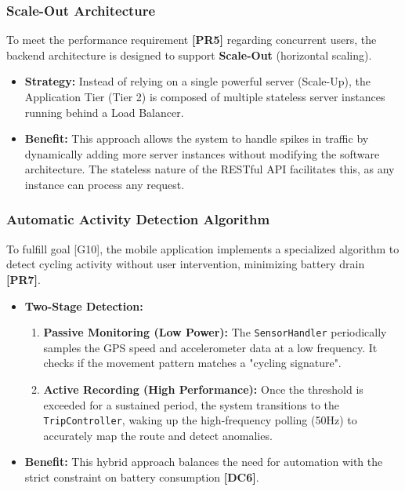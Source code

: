 \subsubsection{Scale-Out Architecture}
To meet the performance requirement \textbf{[PR5]} regarding concurrent users, the backend architecture is designed to support \textbf{Scale-Out} (horizontal scaling).
\begin{itemize}
    \item \textbf{Strategy:} Instead of relying on a single powerful server (Scale-Up), the Application Tier (Tier 2) is composed of multiple stateless server instances running behind a Load Balancer.
    \item \textbf{Benefit:} This approach allows the system to handle spikes in traffic by dynamically adding more server instances without modifying the software architecture. The stateless nature of the RESTful API facilitates this, as any instance can process any request.
\end{itemize}

\subsubsection{Automatic Activity Detection Algorithm}
To fulfill goal [G10], the mobile application implements a specialized algorithm to detect cycling activity without user intervention, minimizing battery drain \textbf{[PR7]}.
\begin{itemize}
    \item \textbf{Two-Stage Detection:}
    \begin{enumerate}
        \item \textbf{Passive Monitoring (Low Power):} The \texttt{SensorHandler} periodically samples the GPS speed and accelerometer data at a low frequency. It checks if the movement pattern matches a "cycling signature".
        \item \textbf{Active Recording (High Performance):} Once the threshold is exceeded for a sustained period, the system transitions to the \texttt{TripController}, waking up the high-frequency polling (50Hz) to accurately map the route and detect anomalies.
    \end{enumerate}
    \item \textbf{Benefit:} This hybrid approach balances the need for automation with the strict constraint on battery consumption \textbf{[DC6]}.
\end{itemize}

